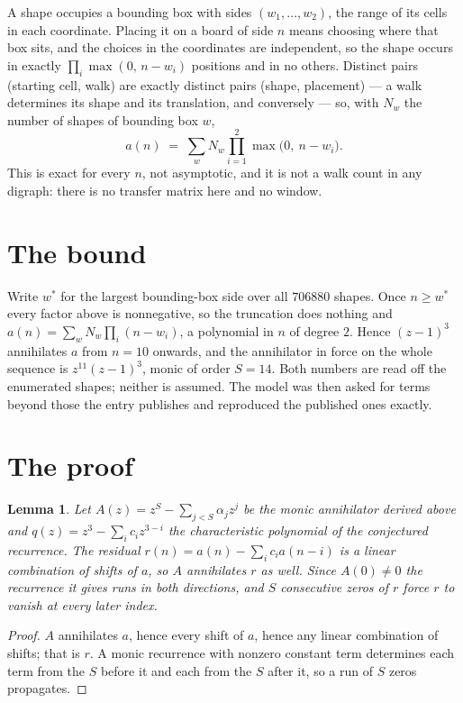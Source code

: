 \documentclass[11pt,a4paper]{article}
\theoremstyle{plain}
\newtheorem{lemma}[theorem]{Lemma}
\theoremstyle{definition}
\begin{document}
A shape occupies a bounding box with sides $(w_1,\dots,w_{2})$, the range of its cells in each
coordinate. Placing it on a board of side $n$ means choosing where that box sits, and the
choices in the coordinates are independent, so the shape occurs in exactly
$\prod_{i}\max(0,\,n-w_i)$ positions and in no others. Distinct pairs (starting cell,
walk) are exactly distinct pairs (shape, placement) --- a walk determines its shape and its
translation, and conversely --- so, with $N_w$ the number of shapes of bounding box $w$,
\[
a(n)\;=\;\sum_{w} N_w \prod_{i=1}^{2}\max\bigl(0,\ n-w_i\bigr).
\]
This is exact for every $n$, not asymptotic, and it is not a walk count in any digraph: there is
no transfer matrix here and no window.

\section{The bound}

Write $w^\ast$ for the largest bounding-box side over all $706880$ shapes. Once $n\ge w^\ast$
every factor above is nonnegative, so the truncation does nothing and
$a(n)=\sum_w N_w\prod_i(n-w_i)$, a polynomial in $n$ of degree $2$. Hence $(z-1)^{3}$
annihilates $a$ from $n=10$ onwards, and the annihilator in force on the whole sequence is
$z^{11}(z-1)^{3}$, monic of order $S=14$. Both numbers are read off the enumerated
shapes; neither is assumed. The model was then asked for terms beyond those the entry publishes
and reproduced the published ones exactly.

\section{The proof}

\begin{lemma}\label{lem:crit}
Let $A(z)=z^S-\sum_{j<S}\alpha_jz^{j}$ be the monic annihilator derived above and
$q(z)=z^{3}-\sum_ic_iz^{3-i}$ the characteristic polynomial of the conjectured
recurrence. The residual $r(n)=a(n)-\sum_ic_ia(n-i)$ is a linear combination of shifts of $a$,
so $A$ annihilates $r$ as well. Since $A(0)\ne0$ the recurrence it gives runs in both
directions, and $S$ consecutive zeros of $r$ force $r$ to vanish at every later index.
\end{lemma}

\begin{proof}
$A$ annihilates $a$, hence every shift of $a$, hence any linear combination of shifts; that is
$r$. A monic recurrence with nonzero constant term determines each term from the $S$ before it
and each from the $S$ after it, so a run of $S$ zeros propagates.
\end{proof}
\end{document}
